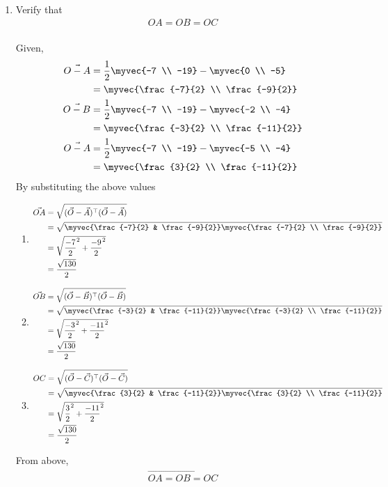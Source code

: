 \documentclass[11pt]{book}
\begin{document}
\begin{enumerate}[label=\thesection.\arabic*.,ref=\thesection.\theenumi]
\item Verify that 
		\begin{align}
			OA = OB = OC 
		\end{align}
  \solution\\
Given,
\begin{align}
    \vec{O - A} &= \frac{1}{2}\myvec{-7 \\ -19} - \myvec{0 \\ -5}\\
    &= \myvec{\frac{-7}{2} \\ \frac{-9}{2}}\\
    \vec{O - B} &= \frac{1}{2}\myvec{-7 \\ -19} - \myvec{-2 \\ -4}\\
    &= \myvec{\frac{-3}{2} \\ \frac{-11}{2}}\\
    \vec{O - A} &= \frac{1}{2}\myvec{-7 \\ -19} - \myvec{-5 \\ -4}\\
    &= \myvec{\frac{3}{2} \\ \frac{-11}{2}}
\end{align}
By substituting the above values
\begin{enumerate}
\item 
\begin{align}
\vec{OA} &= \sqrt{(\vec{O}-\vec{A})^{\top}(\vec{O}-\vec{A})}\\
&= \sqrt{\myvec{\frac{-7}{2} & \frac{-9}{2}} \myvec{\frac{-7}{2} \\ \frac{-9}{2}}}\\
 &= \sqrt{\frac{-7}{2}^2 + \frac{-9}{2}^2}\\
 &= \frac{\sqrt{130}}{2}
\end{align}
\item 
\begin{align}
\vec{OB} &= \sqrt{(\vec{O}-\vec{B})^{\top}(\vec{O}-\vec{B})}\\
 &= \sqrt{\myvec{\frac{-3}{2} & \frac{-11}{2}} \myvec{\frac{-3}{2} \\ \frac{-11}{2}}}\\
 &= \sqrt{\frac{-3}{2}^2 + \frac{-11}{2}^2}\\
 &= \frac{\sqrt{130}}{2}
\end{align}
\item 
\begin{align}
OC &= \sqrt{(\vec{O}-\vec{C})^{\top}(\vec{O}-\vec{C})}\\
 &= \sqrt{\myvec{\frac{3}{2} & \frac{-11}{2}}  \myvec{\frac{3}{2} \\ \frac{-11}{2}}}\\
&= \sqrt{\frac{3}{2}^2 + \frac{-11}{2}^2}\\
 &= \frac{\sqrt{130}}{2}
\end{align}
\end{enumerate}
From above, 
\begin{align}
\vec{OA = OB = OC}
\end{align}


\end{enumerate}
\end{document}

